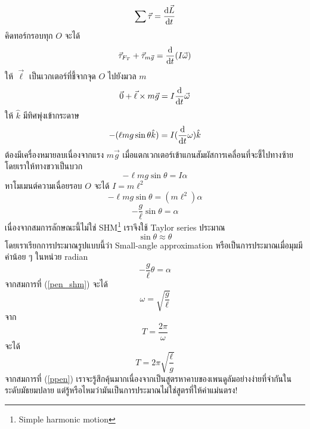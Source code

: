 \documentclass[a4paper,12pt]{article}
\begin{document}
	$$\sum\vec{\tau}=\dv{\vec{L}}{t}$$
	คิดทอร์กรอบทุก $O$ จะได้
	\begin{equation}
	\vec{\tau}_{F_T}+\vec{\tau}_{m\vec{g}}=\dv{t}(I\vec{\omega})
	\end{equation}
	ให้ $\vec{\ell}$ เป็นเวกเตอร์ที่ชี้จากจุด $O$ ไปยังมวล $m$
	$$\vec{0}+\vec{\ell}\times m\vec{g}=I\dv{t}\vec{\omega}$$
	ให้ $\hat{k}$ มีทิศพุ่งเข้ากระดาษ
	$$-(\ell mg\sin\theta\hat{k})=I(\dv{t}\omega)\hat{k}$$
	ต้องมีเครื่องหมายลบเนื่องจากแรง $m\vec{g}$ เมื่อแตกเวกเตอร์เข้าแกนสัมผัสการเคลื่อนที่จะชี้ไปทางซ้าย โดยเราให้ทางขวาเป็นบวก
	$$-\ell mg\sin\theta=I\alpha$$
	หาโมเมนต์ความเฉื่อยรอบ $O$ จะได้ $I=m\ell^2$\\
	$$-\ell mg\sin\theta=(m\ell^2)\alpha$$
	$$-\frac{g}{\ell}\sin\theta=\alpha$$
	เนื่องจากสมการลักษณะนี้ไม่ใช่ SHM\footnote{Simple harmonic motion} เราจึงใช้ Taylor series ประมาณ
	\begin{equation}
	\sin\theta\approx\theta
	\end{equation}
	โดยเราเรียกการประมาณรูปแบบนี้ว่า Small-angle approximation หรือเป็นการประมาณเมื่อมุมมีค่าน้อย ๆ ในหน่วย radian
	\begin{equation}\label{pen_shm}
	\boxed{
		-\frac{g}{\ell}\theta=\alpha
	}
	\end{equation}
	จากสมการที่ (\ref{pen_shm}) จะได้
	$$\omega=\sqrt{\frac{g}{\ell}}$$
	จาก
	$$T=\frac{2\pi}{\omega}$$
	จะได้
	\begin{equation}\label{ppen}
	\boxed{
		T=2\pi\sqrt{\frac{\ell}{g}}
	}
	\end{equation}
\linebreak
	จากสมการที่ (\ref{ppen}) เราจะรู้สึกคุ้นมากเนื่องจากเป็นสูตรหาคาบของเพนดูลัมอย่างง่ายที่จำกันในระดับมัธยมปลาย แต่รู้หรือไหมว่ามันเป็นการประมาณไม่ใช่สูตรที่ให้ค่าแม่นตรง!
\end{document}
